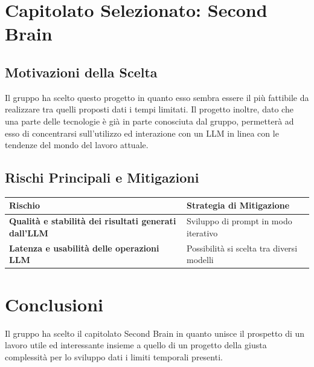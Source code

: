 \section{Capitolato Selezionato: {Second Brain}}

\subsection{Motivazioni della Scelta}
Il gruppo ha scelto questo progetto in quanto esso sembra essere il più fattibile da realizzare tra quelli proposti dati i tempi limitati.
Il progetto inoltre, dato che una parte delle tecnologie è già in parte conosciuta dal gruppo, permetterà ad esso di concentrarsi sull'utilizzo ed interazione con un LLM in linea con le tendenze del mondo del lavoro attuale.

\subsection{Rischi Principali e Mitigazioni}
\begin{table}[ht]
	\centering
	\renewcommand{\arraystretch}{1.4}
	\begin{tabularx}{\textwidth}{l X}
		\toprule
		\textbf{Rischio} & \textbf{Strategia di Mitigazione} \\
		\midrule
		\textbf{Qualità e stabilità dei risultati generati dall'LLM} & Sviluppo di prompt in modo iterativo \\
		\textbf{Latenza e usabilità delle operazioni LLM} & {Possibilità si scelta tra diversi modelli} \\
		\bottomrule
	\end{tabularx}
\end{table}

\section{Conclusioni}
Il gruppo ha scelto il capitolato Second Brain in quanto unisce il prospetto di un lavoro utile ed interessante insieme a quello di un progetto della giusta complessità per lo sviluppo dati i limiti temporali presenti.